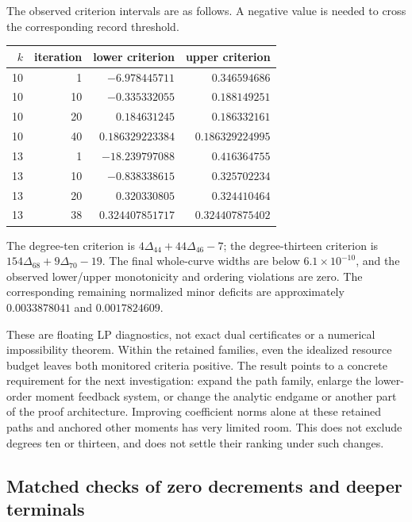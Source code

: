 \documentclass[11pt,letterpaper]{article}
\numberwithin{equation}{section}
\begin{document}
The observed criterion intervals are as follows. A negative value is needed
to cross the corresponding record threshold.
\begin{center}
\begin{tabular}{rrrr}
\toprule
$k$ & iteration & lower criterion & upper criterion\\
\midrule
10&1&$-6.978445711$&$0.346594686$\\
10&10&$-0.335332055$&$0.188149251$\\
10&20&$0.184631245$&$0.186332161$\\
10&40&$0.186329223384$&$0.186329224995$\\
13&1&$-18.239797088$&$0.416364755$\\
13&10&$-0.838338615$&$0.325702234$\\
13&20&$0.320330805$&$0.324410464$\\
13&38&$0.324407851717$&$0.324407875402$\\
\bottomrule
\end{tabular}
\end{center}
The degree-ten criterion is $4\Delta_{44}+44\Delta_{46}-7$; the
degree-thirteen criterion is $154\Delta_{68}+9\Delta_{70}-19$.
The final whole-curve widths are below $6.1\times10^{-10}$, and the
observed lower/upper monotonicity and ordering violations are zero.
The corresponding remaining normalized minor deficits are approximately
$0.0033878041$ and $0.0017824609$.

These are floating LP diagnostics, not exact dual certificates or a
numerical impossibility theorem. Within the retained families, even the
idealized resource budget leaves both monitored criteria positive.
The result points to a concrete requirement for the next investigation:
expand the path family, enlarge the lower-order moment feedback system, or
change the analytic endgame or another part of the proof architecture.
Improving coefficient norms alone at these retained paths and anchored
other moments has very limited room. This does not exclude degrees ten or
thirteen, and does not settle their ranking under such changes.

\par\bigskip{}

\subsection{Matched checks of zero decrements and deeper terminals}
\label{sec:zero-extension}
\end{document}
